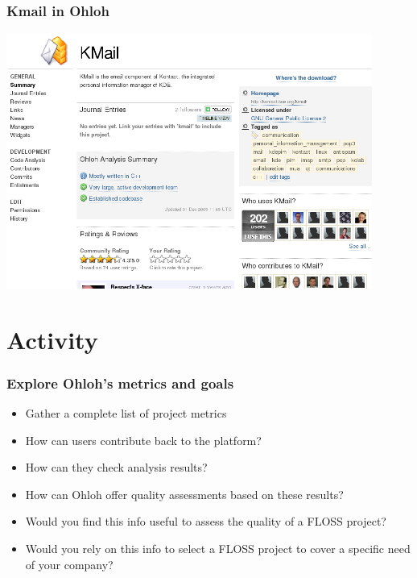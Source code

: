 \documentclass{beamer}
\begin{document}
\begin{frame}
\frametitle{Kmail in Ohloh}
\begin{center}
\includegraphics[width=0.9\textwidth]{figs/ohloh-kmail.png}
\end{center}
\end{frame}

\section{Activity}

\begin{frame}
\frametitle{Explore Ohloh's metrics and goals}
\begin{center}
\begin{itemize}
 \item Gather a complete list of project metrics
 \item How can users contribute back to the platform?
 \item How can they check analysis results?
 \item How can Ohloh offer quality assessments based on these results?
 \item Would you find this info useful to assess the quality of a FLOSS project?
 \item Would you rely on this info to select a FLOSS project to cover a specific need of your company?
\end{itemize}
\end{center}
\end{frame}
\end{document}
